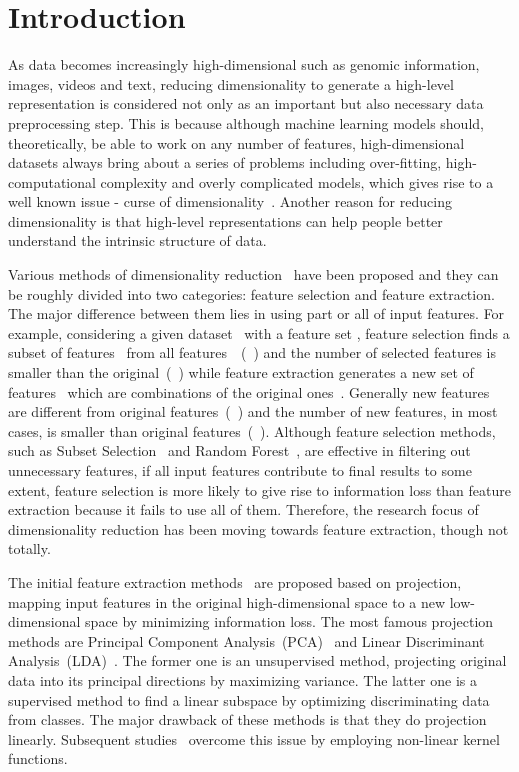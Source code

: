 \documentclass[conference]{IEEEtran}
\begin{document}
	\section{Introduction}
	As data becomes increasingly high-dimensional such as genomic information, images, videos and text, reducing dimensionality to generate a high-level representation is considered not only as an important but also necessary data preprocessing step. This is because although machine learning models should, theoretically, be able to work on any number of features, high-dimensional datasets always bring about a series of problems including over-fitting, high-computational complexity and overly complicated models, which gives rise to a well known issue - curse of dimensionality~\cite{indyk1998approximate}. Another reason for reducing dimensionality is that high-level representations can help people better understand the intrinsic structure of data.
	
	Various methods of dimensionality reduction~\cite{wang2015survey, cunningham2015linear, akkarapatty2016dimensionality,WU:ICDM,WU:IJCNN2} have been proposed and they can be roughly divided into two categories: feature selection and feature extraction. The major difference between them lies in using part or all of input features. For example, considering a given dataset~ with a feature set , feature selection finds a subset of features~ from all features~~(~) and the number of selected features is smaller than the original~(~) while feature extraction generates a new set of features~ which are combinations of the original ones~. Generally new features are different from original features~(~) and the number of new features, in most cases, is smaller than original features~(~). Although feature selection methods, such as Subset Selection~\cite{john1994irrelevant} and Random Forest~\cite{liaw2002classification}, are effective in filtering out unnecessary features, if all input features contribute to final results to some extent, feature selection is more likely to give rise to information loss than feature extraction because it fails to use all of them. Therefore, the research focus of dimensionality reduction has been moving towards feature extraction, though not totally.
	
	The initial feature extraction methods~\cite{khalid2014survey} are proposed based on projection, mapping input features in the original high-dimensional space to a new low-dimensional space by minimizing information loss. The most famous projection methods are Principal Component Analysis~(PCA)~\cite{demvsar2013principal} and Linear Discriminant Analysis~(LDA)~\cite{sharma2015linear}. The former one is an unsupervised method, projecting original data into its principal directions by maximizing variance. The latter one is a supervised method to find a linear subspace by optimizing discriminating data from classes. The major drawback of these methods is that they do projection linearly. Subsequent studies~\cite{scholkopf1997kernel, lee2004nonlinear, honeine2012online, lebart2013correspondence, lopez2014randomized} overcome this issue by employing non-linear kernel functions.
	
\end{document}
